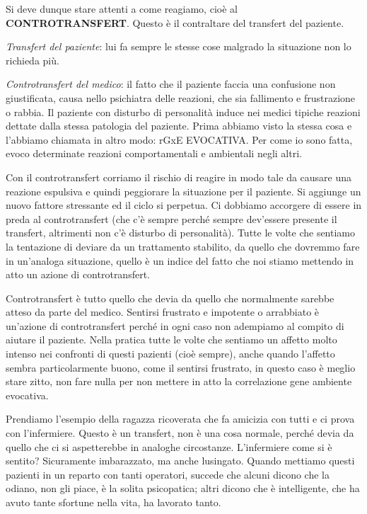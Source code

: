 Si deve dunque stare attenti a come reagiamo, cioè al
\textbf{CONTROTRANSFERT}. Questo è il contraltare del transfert del
paziente.

\emph{Transfert del paziente}: lui fa sempre le stesse cose malgrado la
situazione non lo richieda più.

\emph{Controtransfert del medico}: il fatto che il paziente faccia una
confusione non giustificata, causa nello psichiatra delle reazioni, che
sia fallimento e frustrazione o rabbia. Il paziente con disturbo di
personalità induce nei medici tipiche reazioni dettate dalla stessa
patologia del paziente. Prima abbiamo visto la stessa cosa e l'abbiamo
chiamata in altro modo: rGxE EVOCATIVA. Per come io sono fatta, evoco
determinate reazioni comportamentali e ambientali negli altri.

Con il controtransfert corriamo il rischio di reagire in modo tale da
causare una reazione espulsiva e quindi peggiorare la situazione per il
paziente. Si aggiunge un nuovo fattore stressante ed il ciclo si
perpetua. Ci dobbiamo accorgere di essere in preda al controtransfert
(che c'è sempre perché sempre dev'essere presente il transfert,
altrimenti non c'è disturbo di personalità). Tutte le volte che sentiamo
la tentazione di deviare da un trattamento stabilito, da quello che
dovremmo fare in un'analoga situazione, quello è un indice del fatto che
noi stiamo mettendo in atto un azione di controtransfert.

Controtransfert è tutto quello che devia da quello che normalmente
sarebbe atteso da parte del medico. Sentirsi frustrato e impotente o
arrabbiato è un'azione di controtransfert perché in ogni caso non
adempiamo al compito di aiutare il paziente. Nella pratica tutte le
volte che sentiamo un affetto molto intenso nei confronti di questi
pazienti (cioè sempre), anche quando l'affetto sembra particolarmente
buono, come il sentirsi frustrato, in questo caso è meglio stare zitto,
non fare nulla per non mettere in atto la correlazione gene ambiente
evocativa.

Prendiamo l'esempio della ragazza ricoverata che fa amicizia con tutti e
ci prova con l'infermiere. Questo è un transfert, non è una cosa
normale, perché devia da quello che ci si aspetterebbe in analoghe
circostanze. L'infermiere come si è sentito? Sicuramente imbarazzato, ma
anche lusingato. Quando mettiamo questi pazienti in un reparto con tanti
operatori, succede che alcuni dicono che la odiano, non gli piace, è la
solita psicopatica; altri dicono che è intelligente, che ha avuto tante
sfortune nella vita, ha lavorato tanto.

